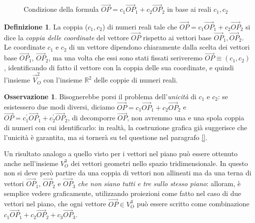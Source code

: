 \documentclass{book}
\theoremstyle{definition}
\newtheorem{defi}{Definizione}[section]
\newtheorem{oss}{Osservazione}[section]
\theoremstyle{plain}
\begin{document}
\begin{figure}[ht!]
  \centering
  \resizebox{6cm}{!}{
      
    }
  \caption{Condizione della formula $\vec{OP}=c_1\vec{OP}_1+c_2\vec{OP}_2$ in base ai reali $c_1,c_2$}
  \label{fig:condizionic1c2}
\end{figure}
\begin{defi}
  La coppia ($c_1,c_2$) di numeri reali tale che $\vec{OP}=c_1\vec{OP}_1+c_2\vec{OP}_2$ si dice la \textit{coppia delle coordinate} del vettore $\vec{OP}$ rispetto ai vettori base $\vec{OP}_1, \vec{OP}_2$.\\
  Le coordinate $c_1$ e $c_2$ di un vettore dipendono chiaramente dalla scelta dei vettori base $\vec{OP}_1$, $\vec{OP}_2$, ma una volta che essi sono stati fissati seriveremo $\vec{OP}\equiv (c_1,c_2)$, identificando di fatto il vettore con la coppia delle sua coordinate, e quindi l'insieme $\vec{V}_O^2$ con l'insieme $\mathds{R}^2$ delle coppie di numeri reali.
\end{defi}
\begin{oss}
  Bisognerebbe porsi il problema dell'\textit{unicità} di $c_1$ e $c_2$: se esistessero due modi diversi, diciamo $\vec{OP}=c_1\vec{OP}_1+c_2\vec{OP}_2$ e $\vec{OP}=c_1^\prime\vec{OP}_1+c_2^\prime\vec{OP}_2$, di decomporre $\vec{OP}$, non avremmo una e una spola coppia di numeri con cui identificarlo: in realtà, la costruzione grafica già suggerisce che l'unicità è garantita, ma si tornerà su tel questione nel paragrafo \ref{}.
\end{oss}
Un risultato analogo a quello visto per i vettori nel piano può essere ottenuto anche nell'insieme $V_O^3$ dei vettori geometri nello spazio tridimensionale. In questo non si deve però partire da una coppia di vettori non allineati ma da una terna di vettori $\vec{OP}_1$, $\vec{OP}_2$ e $\vec{OP}_3$ \textit{che non siano tutti e tre sullo stesso piano}: alloram, è semplice vedere graficamente, utilizzando proiezioni come fatto nel caso di due vettori nel piano, che ogni vettore $\vec{OP}\in V_O^3$ può essere scritto come combinazione $c_1\vec{OP}_1+c_2\vec{OP}_2+c_3\vec{OP}_3$.
\end{document}

